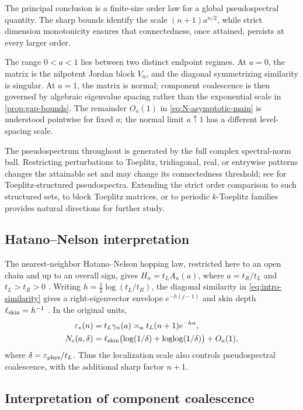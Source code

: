 \documentclass[a4paper,preprint,12pt,nopreprintline,sort&compress]{elsarticle}
\numberwithin{equation}{section}
\theoremstyle{remark}
\begin{document}
The principal conclusion is a finite-size order law for a global
pseudospectral quantity.  The sharp bounds identify the scale
\((n+1)a^{n/2}\), while strict dimension monotonicity ensures that
connectedness, once attained, persists at every larger order.

The range \(0<a<1\) lies between two distinct endpoint regimes.
At \(a=0\), the matrix is the nilpotent Jordan block \(V_n\), and the
diagonal symmetrizing similarity is singular.  At \(a=1\), the matrix is
normal; component coalescence is then governed by algebraic eigenvalue
spacing rather than the exponential scale in \cref{prop:gap-bounds}.
The remainder \(O_a(1)\) in \eqref{eq:N-asymptotic-main} is understood
pointwise for fixed \(a\); the normal limit \(a\uparrow1\) has a different
level-spacing scale.

The pseudospectrum throughout is generated by the full complex
spectral-norm ball.  Restricting perturbations to Toeplitz, tridiagonal,
real, or entrywise patterns changes the attainable set and may change its
connectedness threshold; see \cite{ButtaGuglielmiNoschese2012} for
Toeplitz-structured pseudospectra.  Extending the strict order comparison to
such structured sets, to block Toeplitz matrices, or to periodic
\(k\)-Toeplitz families provides natural directions for further study.

\subsection{Hatano--Nelson interpretation}

The nearest-neighbor Hatano--Nelson hopping law, restricted here to an open
chain and up to an overall sign, gives
\(H_n=t_L A_n(a)\), where \(a=t_R/t_L\) and \(t_L>t_R>0\)
\cite{HatanoNelson1996,HatanoNelson1997}.  Writing
\(h=\tfrac12\log(t_L/t_R)\), the diagonal similarity in
\eqref{eq:intro-similarity} gives a right-eigenvector envelope
\(e^{-h(j-1)}\) and skin depth
\(\ell_{\rm skin}=h^{-1}\) \cite{AmmariEtAl2024}.  In the original units,
\[
 \begin{aligned}
  \varepsilon_*(n)&=t_L\gamma_n(a)
  \asymp_a t_L(n+1)e^{-hn},\\
  N_c(a,\delta)&=\ell_{\rm skin}
  \bigl(\log(1/\delta)+\log\!\log(1/\delta)\bigr)+O_a(1),
 \end{aligned}
\]
where \(\delta=\varepsilon_{\rm phys}/t_L\).  Thus the localization scale
also controls pseudospectral coalescence, with the additional sharp factor
\(n+1\).

\subsection{Interpretation of component coalescence}
\end{document}
